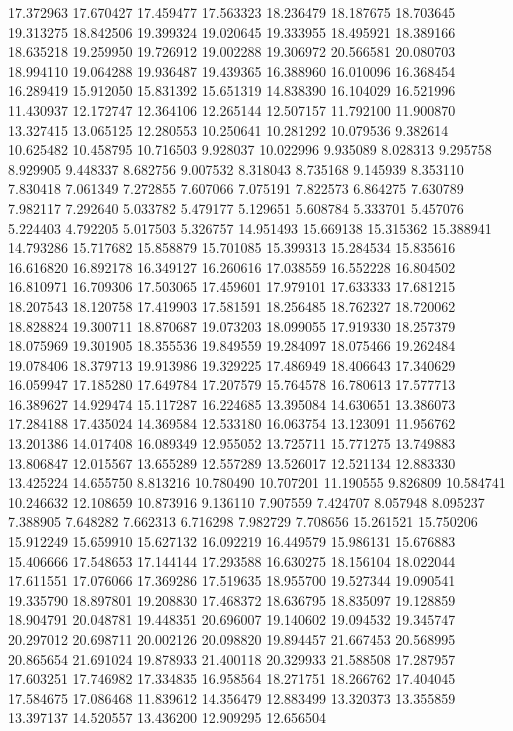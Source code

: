 17.372963
17.670427
17.459477
17.563323
18.236479
18.187675
18.703645
19.313275
18.842506
19.399324
19.020645
19.333955
18.495921
18.389166
18.635218
19.259950
19.726912
19.002288
19.306972
20.566581
20.080703
18.994110
19.064288
19.936487
19.439365
16.388960
16.010096
16.368454
16.289419
15.912050
15.831392
15.651319
14.838390
16.104029
16.521996
11.430937
12.172747
12.364106
12.265144
12.507157
11.792100
11.900870
13.327415
13.065125
12.280553
10.250641
10.281292
10.079536
9.382614
10.625482
10.458795
10.716503
9.928037
10.022996
9.935089
8.028313
9.295758
8.929905
9.448337
8.682756
9.007532
8.318043
8.735168
9.145939
8.353110
7.830418
7.061349
7.272855
7.607066
7.075191
7.822573
6.864275
7.630789
7.982117
7.292640
5.033782
5.479177
5.129651
5.608784
5.333701
5.457076
5.224403
4.792205
5.017503
5.326757
14.951493
15.669138
15.315362
15.388941
14.793286
15.717682
15.858879
15.701085
15.399313
15.284534
15.835616
16.616820
16.892178
16.349127
16.260616
17.038559
16.552228
16.804502
16.810971
16.709306
17.503065
17.459601
17.979101
17.633333
17.681215
18.207543
18.120758
17.419903
17.581591
18.256485
18.762327
18.720062
18.828824
19.300711
18.870687
19.073203
18.099055
17.919330
18.257379
18.075969
19.301905
18.355536
19.849559
19.284097
18.075466
19.262484
19.078406
18.379713
19.913986
19.329225
17.486949
18.406643
17.340629
16.059947
17.185280
17.649784
17.207579
15.764578
16.780613
17.577713
16.389627
14.929474
15.117287
16.224685
13.395084
14.630651
13.386073
17.284188
17.435024
14.369584
12.533180
16.063754
13.123091
11.956762
13.201386
14.017408
16.089349
12.955052
13.725711
15.771275
13.749883
13.806847
12.015567
13.655289
12.557289
13.526017
12.521134
12.883330
13.425224
14.655750
8.813216
10.780490
10.707201
11.190555
9.826809
10.584741
10.246632
12.108659
10.873916
9.136110
7.907559
7.424707
8.057948
8.095237
7.388905
7.648282
7.662313
6.716298
7.982729
7.708656
15.261521
15.750206
15.912249
15.659910
15.627132
16.092219
16.449579
15.986131
15.676883
15.406666
17.548653
17.144144
17.293588
16.630275
18.156104
18.022044
17.611551
17.076066
17.369286
17.519635
18.955700
19.527344
19.090541
19.335790
18.897801
19.208830
17.468372
18.636795
18.835097
19.128859
18.904791
20.048781
19.448351
20.696007
19.140602
19.094532
19.345747
20.297012
20.698711
20.002126
20.098820
19.894457
21.667453
20.568995
20.865654
21.691024
19.878933
21.400118
20.329933
21.588508
17.287957
17.603251
17.746982
17.334835
16.958564
18.271751
18.266762
17.404045
17.584675
17.086468
11.839612
14.356479
12.883499
13.320373
13.355859
13.397137
14.520557
13.436200
12.909295
12.656504
